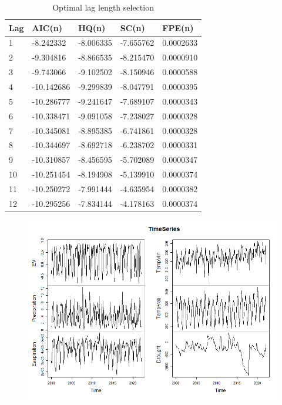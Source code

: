 \begin{table}[]
	\label{table:Optimal lag}
	\caption{Optimal lag length selection}
	\centering
	\addtolength{\tabcolsep}{25pt}
	\begin{tabularx}{\textwidth}{@{}lllll@{}}
		\toprule
	 Lag  &	AIC(n)&	HQ(n)&	SC(n)&	FPE(n)\\\midrule
	1&	-8.242332&	-8.006335&	-7.655762&	0.0002633\\
	2&	-9.304816&	-8.866535&	-8.215470&	0.0000910\\
	3&	-9.743066&	-9.102502&	-8.150946&	0.0000588\\
	4&	-10.142686&	-9.299839&	-8.047791&	0.0000395\\
	5&	-10.286777&	-9.241647&	-7.689107&	0.0000343\\
	6&	-10.338471&	-9.091058&	-7.238027&	0.0000328\\
	7&	-10.345081&	-8.895385&	-6.741861&	0.0000328\\
	8&	-10.344697&	-8.692718&	-6.238702&	0.0000331\\
	9&	-10.310857&	-8.456595&	-5.702089&	0.0000347\\
	10&	-10.251454&	-8.194908&	-5.139910&	0.0000374\\
	11&	-10.250272&	-7.991444&	-4.635954&	0.0000382\\
	12&	-10.295256&	-7.834144&	-4.178163&	0.0000374\\
		 \bottomrule
	\end{tabularx}
\end{table}
\begin{figure}
	\centering
	\includegraphics[width=0.9\linewidth]{images/TimeSeries}
	\caption{}
	\label{fig:TimeSeries}
\end{figure}
